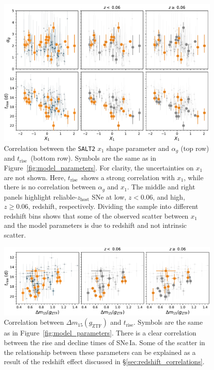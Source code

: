 \documentclass[twocolumn]{./aastex63}
\newcommand{\trise}{$t_\mathrm{rise}$}
\begin{document}
\begin{figure}
    \centering
    \includegraphics[width=6in]{./figures/shape_correlations.pdf}
    \caption{Correlation between the \texttt{SALT2} $x_1$ shape parameter and
    $\alpha_g$ (top row) and \trise\ (bottom row). Symbols are the same as in
    Figure~\ref{fig:model_parameters}. For clarity, the uncertainties on $x_1$
    are not shown. Here, \trise\ shows a strong correlation with $x_1$, while
    there is no correlation between $\alpha_g$ and $x_1$. The middle and right
    panels highlight reliable-$z_\mathrm{host}$ SNe at low, $z < 0.06$, and
    high, $z \ge 0.06$, redshift, respectively. Dividing the sample into
    different redshift bins shows that some of the observed scatter between
    $x_1$ and the model parameters is due to redshift and not intrinsic
    scatter. }
    \label{fig:shape_correlations}
\end{figure}

\begin{figure}
    \centering
    \includegraphics[width=6in]{./figures/dm15_rise.pdf}
    \caption{Correlation between $\Delta m_{15}(g_\mathrm{ZTF})$ and \trise.
    Symbols are the same as in Figure~\ref{fig:model_parameters}. There is a
    clear correlation between the rise and decline times of SNe\,Ia. Some of
    the scatter in the relationship between these parameters can be explained
    as a result of the redshift effect discussed in
    \S\ref{sec:redshift_correlations}.}
    \label{fig:dm15}
\end{figure}
\end{document}
